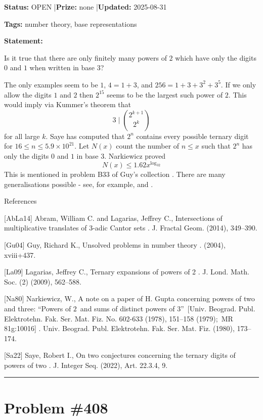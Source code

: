 \documentclass{article}
\begin{document}
\noindent\textbf{Status:} OPEN \quad|\quad \textbf{Prize:} none \quad|\quad \textbf{Updated:} 2025-08-31

\noindent\textbf{Tags:} number theory, base representations

\medskip

\noindent\textbf{Statement:}

Is it true that there are only finitely many powers of $2$ which have only the digits $0$ and $1$ when written in base $3$?




The only examples seem to be $1$, $4=1+3$, and $256=1+3+3^2+3^5$. If we only allow the digits $1$ and $2$ then $2^{15}$ seems to be the largest such power of $2$. This would imply via Kummer's theorem that\[3\mid \binom{2^{k+1}}{2^k}\]for all large $k$. Saye \cite{Sa22} has computed that $2^n$ contains every possible ternary digit for $16\leq n \leq 5.9\times 10^{21}$. Let $N(x)$ count the number of $n\leq x$ such that $2^n$ has only the digits $0$ and $1$ in base $3$. Narkiewicz \cite{Na80} proved\[N(x)\leq 1.62 x^{\log_32}\]This is mentioned in problem B33 of Guy's collection \cite{Gu04}. There are many generalisations possible - see, for example, \cite{AbLa14} and \cite{La09}.




References

[AbLa14] Abram, William C. and Lagarias, Jeffrey C., Intersections of multiplicative translates of 3-adic {C}antor sets . J. Fractal Geom. (2014), 349--390.

[Gu04] Guy, Richard K., Unsolved problems in number theory . (2004), xviii+437.

[La09] Lagarias, Jeffrey C., Ternary expansions of powers of 2 . J. Lond. Math. Soc. (2) (2009), 562--588.

[Na80] Narkiewicz, W., A note on a paper of {H}. {G}upta concerning powers of two and three: ``{P}owers of {$2$}\ and sums of distinct powers of {$3$}''\ [{U}niv. {B}eograd. {P}ubl. {E}lektrotehn. {F}ak. Ser. {M}at. {F}iz. {N}o. 602-633 (1978), 151--158 (1979);\ {MR} 81g:10016] . Univ. Beograd. Publ. Elektrotehn. Fak. Ser. Mat. Fiz. (1980), 173--174.

[Sa22] Saye, Robert I., On two conjectures concerning the ternary digits of powers of two . J. Integer Seq. (2022), Art. 22.3.4, 9.

\noindent\rule{\linewidth}{0.4pt}


\section{Problem \#408}
\label{prob:408}
\end{document}
